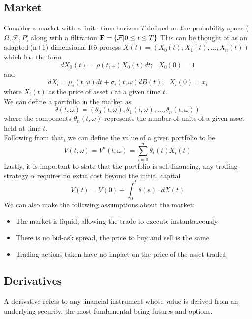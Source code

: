 \documentclass[12pt]{article}
\numberwithin{equation}{section}
\begin{document}
\subsection{Market}
Consider a market with a finite time horizon $T$ defined on the probability space 
($\Omega,\mathcal{F},P$) along with a filtration $\bold{F} = \{\mathcal{F}| 0 \leq t \leq T \}$ 
This can be thought of as an adapted (n+1) dimensional It$\hat{o}$ process 
$X(t) = (X_0(t), X_1(t),...,X_n(t))$
which has the form 
\begin{equation}
dX_0(t) = \rho(t,\omega)X_0(t)dt;\hspace{8pt}X_0(0)=1
\end{equation}and
\begin{equation}
dX_i = \mu_i(t,\omega)dt+\sigma_i(t,\omega)dB(t);\hspace{8pt}X_i(0)=x_i 
\end{equation}
where $X_i(t)$ as the price of asset $i$ at a given time $t$.
\\
We can define a portfolio in the market as 
\begin{equation}
\theta(t,\omega) = (\theta_0(t,\omega),\theta_1(t,\omega),...,\theta_n(t,\omega))
\end{equation}
where the components $\theta_n(t,\omega)$ represents the number of units of a given 
asset held at time $t$.\\
Following from that, we can define the value of a given portfolio to be 
\begin{equation}
  V(t,\omega) = V^{\theta}(t,\omega) = \sum_{i=0}^n \theta_i(t)X_i(t)
\end{equation}
Lastly, it is important to state that the portfolio is self-financing, any 
trading strategy $\alpha$ requires no extra cost beyond the initial capital
\begin{equation}
  V(t) = V(0) + \int_0^t\theta(s)\cdot dX(t)
\end{equation}
We can also make the following assumptions about the market:
\begin{itemize}
  \item The market is liquid, allowing the trade to execute instantaneously
  \item There is no bid-ask spread, the price to buy and sell is the same 
  \item Trading actions taken have no impact on the price of the asset traded 
\end{itemize}


\subsection{Derivatives}
A derivative refers to any financial instrument whose value is derived from an 
underlying security, the most fundamental being futures and options.
\end{document}
